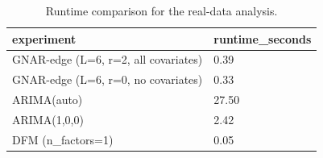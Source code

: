 \begin{table}
\caption{Runtime comparison for the real-data analysis.}
\label{tab:real_data_timing}
\begin{tabular}{ll}
\toprule
experiment & runtime_seconds \\
\midrule
GNAR-edge (L=6, r=2, all covariates) & 0.39 \\
GNAR-edge (L=6, r=0, no covariates) & 0.33 \\
ARIMA(auto) & 27.50 \\
ARIMA(1,0,0) & 2.42 \\
DFM (n_factors=1) & 0.05 \\
\bottomrule
\end{tabular}
\end{table}
